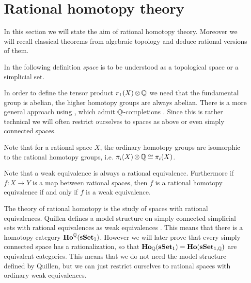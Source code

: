 
\chapter{Rational homotopy theory}
\label{sec:basics}

In this section we will state the aim of rational homotopy theory. Moreover we will recall classical theorems from algebraic topology and deduce rational versions of them.

In the following definition \emph{space} is to be understood as a topological space or a simplicial set.



In order to define the tensor product $\pi_1(X) \operatorname*{\otimes} \mathbb{Q}$ we need that the fundamental group is abelian, the higher homotopy groups are always abelian. There is a more general approach using , which admit $\mathbb{Q}$-completions \cite{bousfield}. Since this is rather technical we will often restrict ourselves to spaces as above or even simply connected spaces.

Note that for a rational space $X$, the ordinary homotopy groups are isomorphic to the rational homotopy groups, i.e. $\pi_i(X) \operatorname*{\otimes} \mathbb{Q} \cong \pi_i(X)$.



Note that a weak equivalence is always a rational equivalence. Furthermore if $f: X \to Y$ is a map between rational spaces, then $f$ is a rational homotopy equivalence if and only if $f$ is a weak equivalence.

The theory of rational homotopy is the study of spaces with rational equivalences. Quillen defines a model structure on simply connected simplicial sets with rational equivalences as weak equivalences \cite{quillen}. This means that there is a homotopy category $\mathbf{Ho}^{\mathbb{Q}}(\mathbf{s{\mathbf{Set}}}_1)$. However we will later prove that every simply connected space has a rationalization, so that $\mathbf{Ho}_{\mathbb{Q}}(\mathbf{s{\mathbf{Set}}}_1) = \mathbf{Ho}(\mathbf{s{\mathbf{Set}}}_{1,\mathbb{Q}})$ are equivalent categories. This means that we do not need the model structure defined by Quillen, but we can just restrict ourselves to rational spaces with ordinary weak equivalences.


